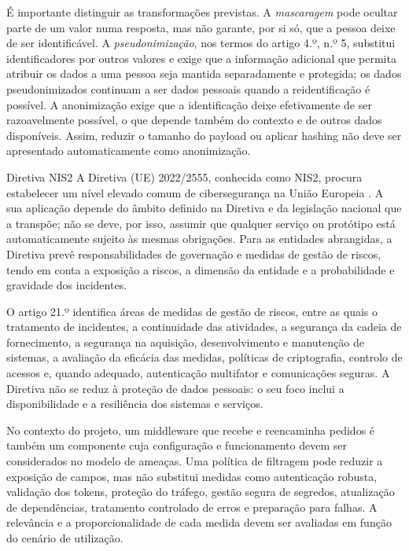 \documentclass[12pt,reqno, twoside]{amsbook}
\makeatletter
\def\section{\@startsection{section}{1}%
      \z@{.5\linespacing\@plus.7\linespacing}{.25\linespacing}%
      {\normalfont\bfseries\flushleft}}
\theoremstyle{plain}
\numberwithin{equation}{chapter}
\numberwithin{table}{chapter}
\numberwithin{figure}{chapter}
\numberwithin{section}{chapter}
\makeatother
\begin{document}
\noindent É importante distinguir as transformações previstas. A \textit{mascaragem} pode ocultar parte de um valor numa resposta, mas não garante, por si só, que a pessoa deixe de ser identificável. A \textit{pseudonimização}, nos termos do artigo 4.º, n.º 5, substitui identificadores por outros valores e exige que a informação adicional que permita atribuir os dados a uma pessoa seja mantida separadamente e protegida; os dados pseudonimizados continuam a ser dados pessoais quando a reidentificação é possível. A anonimização exige que a identificação deixe efetivamente de ser razoavelmente possível, o que depende também do contexto e de outros dados disponíveis. Assim, reduzir o tamanho do payload ou aplicar hashing não deve ser apresentado automaticamente como anonimização.

\section{Diretiva NIS2}
\noindent A Diretiva (UE) 2022/2555, conhecida como NIS2, procura estabelecer um nível elevado comum de cibersegurança na União Europeia \cite{nis22022}. A sua aplicação depende do âmbito definido na Diretiva e da legislação nacional que a transpõe; não se deve, por isso, assumir que qualquer serviço ou protótipo está automaticamente sujeito às mesmas obrigações. Para as entidades abrangidas, a Diretiva prevê responsabilidades de governação e medidas de gestão de riscos, tendo em conta a exposição a riscos, a dimensão da entidade e a probabilidade e gravidade dos incidentes.

\noindent O artigo 21.º identifica áreas de medidas de gestão de riscos, entre as quais o tratamento de incidentes, a continuidade das atividades, a segurança da cadeia de fornecimento, a segurança na aquisição, desenvolvimento e manutenção de sistemas, a avaliação da eficácia das medidas, políticas de criptografia, controlo de acessos e, quando adequado, autenticação multifator e comunicações seguras. A Diretiva não se reduz à proteção de dados pessoais: o seu foco inclui a disponibilidade e a resiliência dos sistemas e serviços.

\noindent No contexto do projeto, um middleware que recebe e reencaminha pedidos é também um componente cuja configuração e funcionamento devem ser considerados no modelo de ameaças. Uma política de filtragem pode reduzir a exposição de campos, mas não substitui medidas como autenticação robusta, validação dos tokens, proteção do tráfego, gestão segura de segredos, atualização de dependências, tratamento controlado de erros e preparação para falhas. A relevância e a proporcionalidade de cada medida devem ser avaliadas em função do cenário de utilização.
\end{document}
